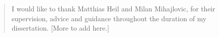 \begin{quotation}
I would like to thank Matthias Heil and Milan Mihajlovic, for their supervision, advice and guidance throughout the duration of my dissertation. [More to add here.]
\end{quotation}
